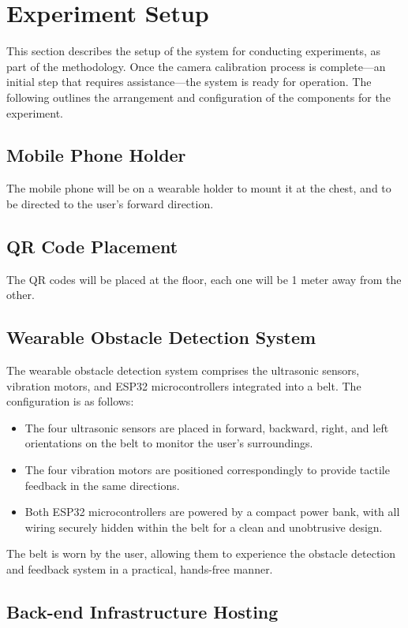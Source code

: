 \section{Experiment Setup}

This section describes the setup of the system for conducting experiments, as part of the methodology. Once the camera calibration process is complete—an initial step that requires assistance—the system is ready for operation. The following outlines the arrangement and configuration of the components for the experiment.

\subsection{Mobile Phone Holder}
The mobile phone will be on a wearable holder to mount it at the chest, and to be directed to the user's forward direction.

\subsection{QR Code Placement}
The QR codes will be placed at the floor, each one will be 1 meter away from the other.

\subsection{Wearable Obstacle Detection System}

The wearable obstacle detection system comprises the ultrasonic sensors, vibration motors, and ESP32 microcontrollers integrated into a belt. The configuration is as follows:

\begin{itemize}
	\item The four ultrasonic sensors are placed in forward, backward, right, and left orientations on the belt to monitor the user’s surroundings.
	\item The four vibration motors are positioned correspondingly to provide tactile feedback in the same directions.
	\item Both ESP32 microcontrollers are powered by a compact power bank, with all wiring securely hidden within the belt for a clean and unobtrusive design.
\end{itemize}

The belt is worn by the user, allowing them to experience the obstacle detection and feedback system in a practical, hands-free manner.

\subsection{Back-end Infrastructure Hosting}

